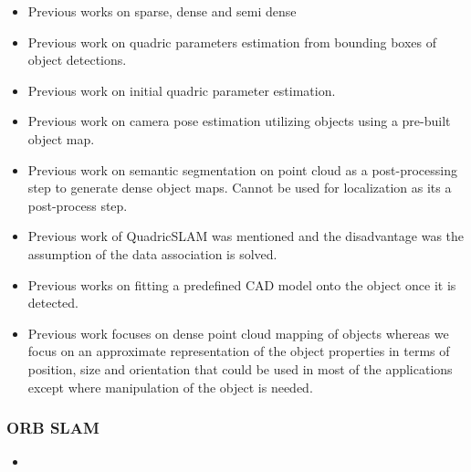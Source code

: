 \documentclass{article}
\begin{document}
\begin{itemize}
    \item Previous works on sparse, dense and semi dense
    \item Previous work on quadric parameters estimation from bounding boxes of object detections.
    \item Previous work on initial quadric parameter estimation.
    \item Previous work on camera pose estimation utilizing objects using a pre-built object map.
    \item Previous work on semantic segmentation on point cloud as a post-processing step to generate dense object maps. Cannot be used for localization as its a post-process step.
    \item Previous work of QuadricSLAM\cite{quadric2} was mentioned and the disadvantage was the assumption of the data association is solved.
    \item Previous works on fitting a predefined CAD model onto the object once it is detected.
    \item Previous work focuses on dense point cloud mapping of objects whereas we focus on an approximate representation of the object properties in terms of position, size and orientation that could be used in most of the applications except where manipulation of the object is needed.
    
\end{itemize}

\subsubsection{ORB SLAM}
\begin{itemize}
    \item 
\end{itemize}
\end{document}
